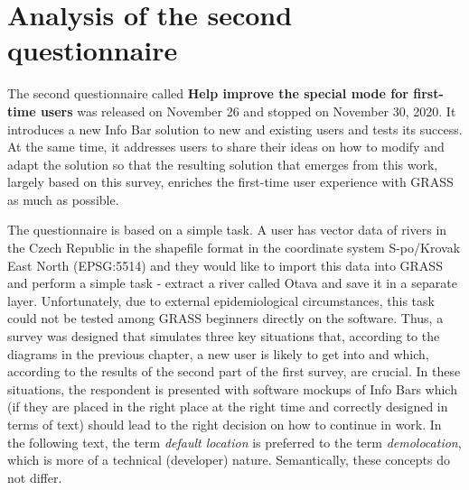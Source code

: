 \documentclass[a4paper,10pt,twoside]{article}
\begin{document}

\newpage
\vspace*{-1cm}
\section{Analysis of the second questionnaire}
\label{sec:qstat2}

\noindent The second questionnaire called \textbf{Help improve the
  special mode for first-time users} was released on November 26 and
stopped on November 30, 2020. It introduces a new Info Bar solution to
new and existing users and tests its success. At the same time, it
addresses users to share their ideas on how to modify and adapt the
solution so that the resulting solution that emerges from this work,
largely based on this survey, enriches the first-time user experience
with GRASS as much as possible.

The questionnaire is based on a simple task. A user has vector data of
rivers in the Czech Republic in the shapefile format in the coordinate
system S-po/Krovak East North (EPSG:5514) and they would like to
import this data into GRASS and perform a simple task - extract a
river called Otava and save it in a separate layer. Unfortunately, due
to external epidemiological circumstances, this task could not be
tested among GRASS beginners directly on the software. Thus, a survey
was designed that simulates three key situations that, according to
the diagrams in the previous chapter, a new user is likely to get into
and which, according to the results of the second part of the first
survey, are crucial. In these situations, the respondent is presented
with software mockups of Info Bars which (if they are placed in the
right place at the right time and correctly designed in terms of text)
should lead to the right decision on how to continue in work. In the
following text, the term \textit{default location} is preferred to the
term \textit{demolocation}, which is more of a technical (developer)
nature. Semantically, these concepts do not differ.
\end{document}
